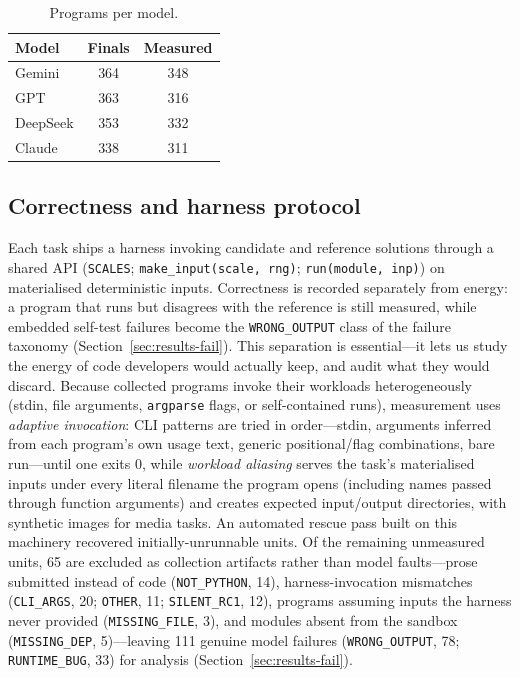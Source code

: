 \documentclass[journal]{IEEEtran}
\begin{document}
\begin{table}[htbp]
\caption{Programs per model.}
\label{tab:models}
\centering
\begin{tabular}{lcc}
\toprule
Model & Finals & Measured \\
\midrule
Gemini & 364 & 348 \\
GPT & 363 & 316 \\
DeepSeek & 353 & 332 \\
Claude & 338 & 311 \\
\bottomrule
\end{tabular}
\end{table}

\subsection{Correctness and harness protocol}
Each task ships a harness invoking candidate and reference solutions through
a shared API (\texttt{SCALES}; \texttt{make\_input(scale, rng)};
\texttt{run(module, inp)}) on materialised deterministic inputs. Correctness
is recorded separately from energy: a program that runs but disagrees with
the reference is still measured, while embedded self-test failures become
the \texttt{WRONG\_OUTPUT} class of the failure taxonomy
(Section~\ref{sec:results-fail}). This separation is essential---it lets us
study the energy of code developers would actually keep, and audit what they
would discard. Because collected programs invoke their workloads
heterogeneously (stdin, file arguments, \texttt{argparse} flags, or
self-contained runs), measurement uses \emph{adaptive invocation}: CLI
patterns are tried in order---stdin, arguments inferred from each program's
own usage text, generic positional/flag combinations, bare run---until one
exits 0, while \emph{workload aliasing} serves the task's materialised
inputs under every literal filename the program opens (including names
passed through function arguments) and creates expected input/output
directories, with synthetic images for media tasks. An automated rescue pass
built on this machinery recovered initially-unrunnable units. Of the
remaining unmeasured units, 65 are excluded as collection artifacts rather
than model faults---prose submitted instead of code (\texttt{NOT\_PYTHON},
14), harness-invocation mismatches (\texttt{CLI\_ARGS}, 20;
\texttt{OTHER}, 11; \texttt{SILENT\_RC1}, 12), programs assuming inputs the
harness never provided (\texttt{MISSING\_FILE}, 3), and modules absent from
the sandbox (\texttt{MISSING\_DEP}, 5)---leaving 111 genuine model failures
(\texttt{WRONG\_OUTPUT}, 78; \texttt{RUNTIME\_BUG}, 33) for analysis
(Section~\ref{sec:results-fail}).
\end{document}
